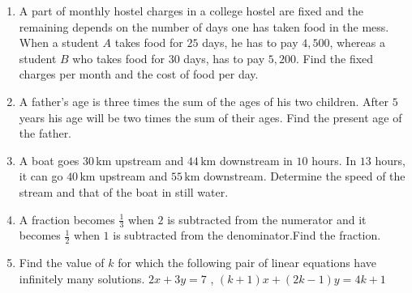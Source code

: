 \begin{enumerate}
\item A part of monthly hostel charges in a college hostel are fixed and the remaining depends on the number of days one has taken food in the mess. When a student $A$ takes food for $25$ days, he has to pay {\rupee $4,500$}, whereas a student $B$ who takes food for $30$ days, has to pay {\rupee $5,200$}. Find the fixed charges per month and the cost of food per day.


\item A father's age is three times the sum of the ages of his two children. After $5$ years his age will be two times the sum of their ages. Find the present age of the father.
\item A boat goes $30 \,\text{km}$ upstream and $44 \,\text{km}$ downstream in $10$ hours. In $13$ hours, it can go $40\,\text{km}$ upstream and $55 \,\text{km}$ downstream. Determine the speed of the stream and that of the boat in still water.

\item A fraction becomes $\frac{1}{3}$ when $2$ is subtracted from the numerator and it becomes $\frac{1}{2}$ when $1$ is subtracted from the denominator.Find the fraction.

\item Find the value of $k$ for which the following pair of linear equations have infinitely many solutions. $2x+3y=7$ , $(k+1)x+(2k-1)y=4k+1$
\end{enumerate}

